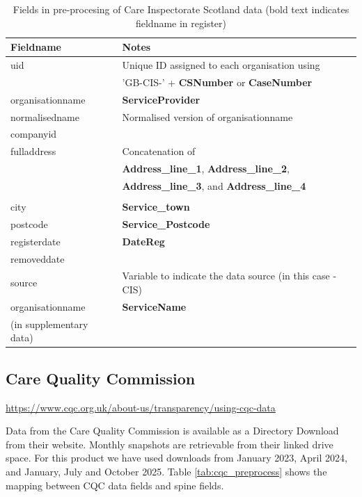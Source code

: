 \documentclass{article}
\begin{document}
\begin{table}[h]
  \centering
  \begin{tabularx}{\textwidth}{|l|X|}
    \hline
    Fieldname  &	Notes \\
    \hline \hline
uid & Unique ID assigned to each organisation using \\
&'GB-CIS-' + \textbf{CSNumber} or \textbf{CaseNumber}\\ \hline
organisationname & \textbf{ServiceProvider} \\ \hline
normalisedname & Normalised version of organisationname\\ \hline
companyid &  \\ \hline
fulladdress &  Concatenation of \\
& \textbf{Address\_line\_1}, \textbf{Address\_line\_2}, \\
& \textbf{Address\_line\_3}, and 
\textbf{Address\_line\_4}\\
\\ \hline
city & \textbf{Service\_town}\\ \hline
postcode & \textbf{Service\_Postcode}\\ \hline
registerdate & \textbf{DateReg} \\ \hline
removeddate & \\ \hline
source & Variable to indicate the data source (in this case - CIS) \\ \hline
\hline \hline
organisationname & \textbf{ServiceName} \\
(in supplementary data) & \\ \hline
\hline
\end{tabularx}
  \caption{Fields in pre-procesing of Care Inspectorate Scotland data (bold text indicates fieldname in register)}
  \label{tab:cis_preprocess}
  
\end{table}




\clearpage
\subsection{Care Quality Commission }
\url{https://www.cqc.org.uk/about-us/transparency/using-cqc-data}


Data from the Care Quality Commission is available as a Directory Download from their website. Monthly snapshots
are retrievable from their linked drive space. For this product we have used downloads from January 2023, April 2024, 
and January, July and October 2025. Table \ref{tab:cqc_preprocess} shows the mapping between CQC data fields and spine fields.
\end{document}
